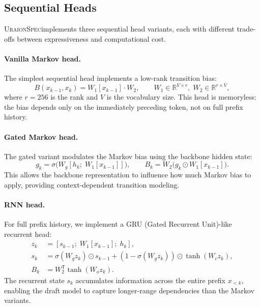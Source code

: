 \documentclass[11pt,a4paper]{article}
\newcommand{\UraionSpec}{\textsc{UraionSpec}}
\begin{document}
\subsection{Sequential Heads}
\label{subsec:sequential-heads}

\UraionSpec implements three sequential head variants, each with
different trade-offs between expressiveness and computational cost.

\paragraph{Vanilla Markov head.}
The simplest sequential head implements a low-rank transition bias:
\begin{equation}
  B(x_{k-1}, x_k) = W_1[x_{k-1}] \cdot W_2,
  \qquad
  W_1 \in \mathbb{R}^{V \times r},\; W_2 \in \mathbb{R}^{r \times V},
\end{equation}
where $r = 256$ is the rank and $V$ is the vocabulary size. This head is
memoryless: the bias depends only on the immediately preceding token, not
on full prefix history.

\paragraph{Gated Markov head.}
The gated variant modulates the Markov bias using the backbone hidden state:
\begin{equation}
  g_k = \sigma\bigl(W_g [h_k ;\; W_1[x_{k-1}]]\bigr), \qquad
  B_k = W_2\bigl(g_k \odot W_1[x_{k-1}]\bigr).
\end{equation}
This allows the backbone representation to influence how much Markov bias to
apply, providing context-dependent transition modeling.

\paragraph{RNN head.}
For full prefix history, we implement a GRU (Gated Recurrent Unit)-like recurrent head:
\begin{align}
  z_k &= [s_{k-1} ;\; W_1[x_{k-1}] ;\; h_k], \\
  s_k &= \sigma(W_g z_k) \odot s_{k-1} + (1 - \sigma(W_g z_k)) \odot \tanh(W_c z_k), \\
  B_k &= W_2^{\mathsf{T}} \tanh(W_o z_k).
\end{align}
The recurrent state $s_k$ accumulates information across the entire prefix
$x_{<k}$, enabling the draft model to capture longer-range dependencies
than the Markov variants.
\end{document}
